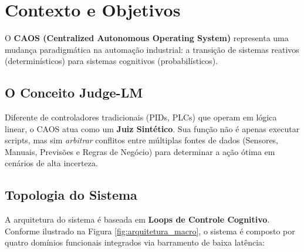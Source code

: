 \documentclass[12pt, a4paper]{article}
\begin{document}
\section{Contexto e Objetivos}
\label{sec:fundacao}

O \textbf{CAOS (Centralized Autonomous Operating System)} representa uma mudança paradigmática na automação industrial: a transição de sistemas reativos (determinísticos) para sistemas cognitivos (probabilísticos).

\subsection{O Conceito Judge-LM}

Diferente de controladores tradicionais (PIDs, PLCs) que operam em lógica linear, o CAOS atua como um \textbf{Juiz Sintético}. Sua função não é apenas executar scripts, mas sim \textit{arbitrar} conflitos entre múltiplas fontes de dados (Sensores, Manuais, Previsões e Regras de Negócio) para determinar a ação ótima em cenários de alta incerteza.

\subsection{Topologia do Sistema}

A arquitetura do sistema é baseada em \textbf{Loops de Controle Cognitivo}. Conforme ilustrado na Figura \ref{fig:arquitetura_macro}, o sistema é composto por quatro domínios funcionais integrados via barramento de baixa latência:
\end{document}
